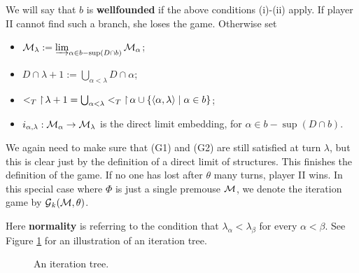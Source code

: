 We will say that $b$ is \textbf{wellfounded} if the above conditions (i)-(ii) apply. If player II cannot find such a branch, she loses the game. Otherwise set
\begin{itemize}
\item $\operatorname{\mathcal{M}}_\lambda:=\varinjlim_{\alpha\in b-\sup(D\cap b)}\operatorname{\mathcal{M}}_\alpha$;
\item $D\cap\lambda+1:=\bigcup_{\alpha<\lambda}D\cap\alpha$;
\item $<_T\operatorname{\upharpoonright}\lambda+1=\bigcup_{\alpha<\lambda}<_T\operatorname{\upharpoonright}\alpha\cup\{\langle \alpha,\lambda\rangle\mid\alpha\in b\}$;
\item $i_{\alpha,\lambda}:\operatorname{\mathcal{M}}_\alpha\to\operatorname{\mathcal{M}}_\lambda$ is the direct limit embedding, for $\alpha\in b-\sup(D\cap b)$.\\
\end{itemize}

We again need to make sure that (G1) and (G2) are still satisfied at turn $\lambda$, but this is clear just by the definition of a direct limit of structures. This finishes the definition of the game. If no one has lost after $\theta$ many turns, player II wins. In this special case where $\Phi$ is just a single premouse $\operatorname{\mathcal{M}}$, we denote the iteration game by $\operatorname{\mathcal{G}}_k(\operatorname{\mathcal{M}},\theta)$.


Here \textbf{normality} is referring to the condition that $\lambda_\alpha<\lambda_\beta$ for every $\alpha<\beta$. See Figure \ref{fig.ittree} for an illustration of an iteration tree.

\begin{figure}
\caption{An iteration tree.}
\label{fig.ittree}
\end{figure}


